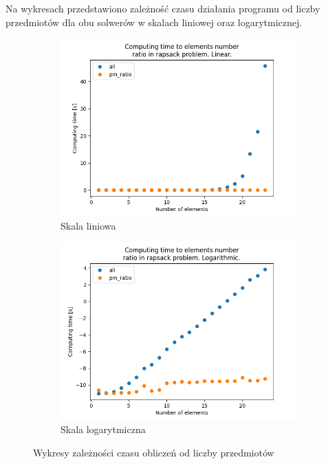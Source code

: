     
    Na wykresach przedstawiono zależność czasu działania programu od liczby przedmiotów dla obu solwerów w skalach liniowej oraz logarytmicznej.
    
    
	\begin{figure}[h!]
		\centering
		\begin{subfigure}[b]{0.45\linewidth}
			\includegraphics[width=\linewidth]{photos/test_lin.png}
			\caption{Skala liniowa}
		\end{subfigure}
		\begin{subfigure}[b]{0.45\linewidth}
			\includegraphics[width=\linewidth]{photos/test_log.png}
			\caption{Skala logarytmiczna}
		\end{subfigure}
		\caption{Wykresy zależności czasu obliczeń od liczby przedmiotów}
	\end{figure}
	
